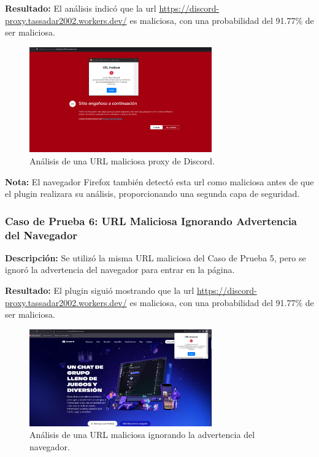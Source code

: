 \textbf{Resultado:}
El análisis indicó que la \gls{url} \url{https://discord-proxy.tassadar2002.workers.dev/} es maliciosa, con una probabilidad del 91.77\% de ser maliciosa.

\begin{figure}[H]
    \centering
    \includegraphics[width=0.7\textwidth]{image5.png}
    \caption{Análisis de una URL maliciosa proxy de Discord.}
    \label{fig:discord_proxy}
\end{figure}

\textbf{Nota:}
El navegador Firefox también detectó esta \gls{url} como maliciosa antes de que el plugin realizara su análisis, proporcionando una segunda capa de seguridad.


\subsubsection*{Caso de Prueba 6: URL Maliciosa Ignorando Advertencia del Navegador}
\textbf{Descripción:}
Se utilizó la misma URL maliciosa del Caso de Prueba 5, pero se ignoró la advertencia del navegador para entrar en la página.

\textbf{Resultado:}
El plugin siguió mostrando que la \gls{url} \url{https://discord-proxy.tassadar2002.workers.dev/} es maliciosa, con una probabilidad del 91.77\% de ser maliciosa.

\begin{figure}[H]
    \centering
    \includegraphics[width=0.7\textwidth]{image6.png}
    \caption{Análisis de una URL maliciosa ignorando la advertencia del navegador.}
    \label{fig:discord_proxy_ignored}
\end{figure}


